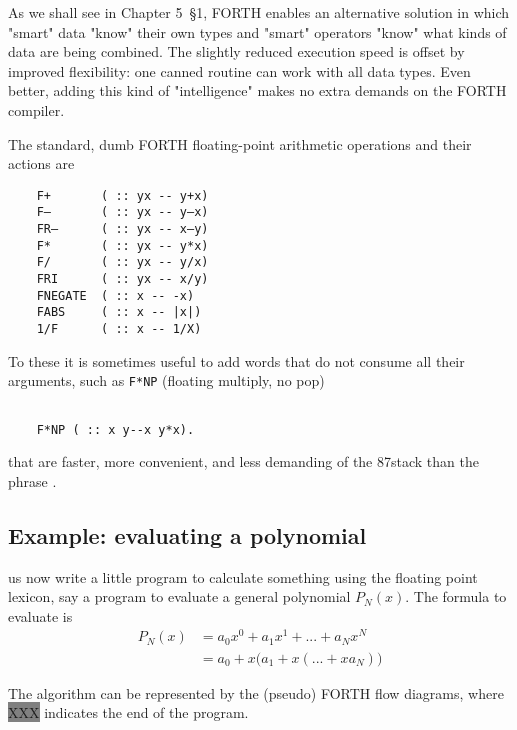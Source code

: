 As we shall see in Chapter 5~\S1, FORTH enables an alternative
solution in which "smart" data "know" their own types and
"smart" operators "know" what kinds of data are being combined.
The slightly reduced execution speed is offset by improved
flexibility: one canned routine can work with all data types. Even
better, adding this kind of "intelligence" makes no extra demands
on the FORTH compiler.

The standard, dumb FORTH floating-point arithmetic operations and their actions are

\begin{verbatim}
    F+       ( :: yx -- y+x)
    F—       ( :: yx -- y—x)
    FR—      ( :: yx -- x—y)
    F*       ( :: yx -- y*x)
    F/       ( :: yx -- y/x)
    FRI      ( :: yx -- x/y)
    FNEGATE  ( :: x -- -x)
    FABS     ( :: x -- |x|)
    1/F      ( :: x -- 1/X)
\end{verbatim}

To these it is sometimes useful to add words that do not consume
all their arguments, such as \verb|F*NP| (floating multiply, no pop)

\begin{verbatim}

    F*NP ( :: x y--x y*x).

\end{verbatim}

that are faster, more convenient, and less demanding of the
87stack than the phrase .

\subsection{Example: evaluating a polynomial}
 us now write a little program to calculate something using
the floating point lexicon, say a program to evaluate a general
polynomial $P_N (x)$. The formula to evaluate is
\begin{align}
    P_N(x)&=a_0x^0+a_1x^1+...+a_Nx^N \nonumber \\
    &=a_0+x\big(a_1+x(... +xa_N)\big)\nonumber
\end{align}



The algorithm can be represented by the (pseudo) FORTH flow
diagrams, where
{\colorbox{gray}{\color{gray}XXX}} indicates the end of the program.

